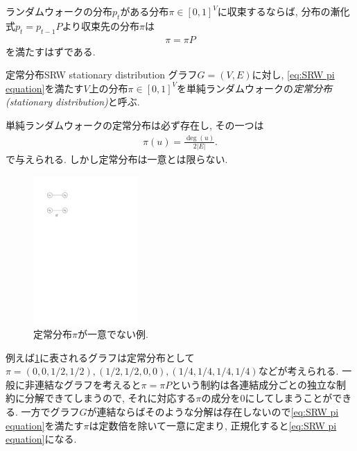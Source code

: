 ランダムウォークの分布$p_t$がある分布$\pi\in[0,1]^V$に収束するならば, 分布の漸化式$p_t = p_{t-1}P$より収束先の分布$\pi$は
\begin{align}
  \pi = \pi P \label{eq:SRW pi equation}
\end{align}
を満たすはずである.
%
\begin{definition}{定常分布}{SRW stationary distribution}
  グラフ$G=(V,E)$に対し, \cref{eq:SRW pi equation}を満たす$V$上の分布$\pi\in[0,1]^V$を単純ランダムウォークの\emph{定常分布 (stationary distribution)}と呼ぶ.
\end{definition}
%
単純ランダムウォークの定常分布は必ず存在し, その一つは
\begin{align}
  \pi(u) = \frac{\deg(u)}{2|E|}. \label{eq:SRW stationary distribution}
\end{align}
で与えられる.
しかし定常分布は一意とは限らない.
\begin{figure}
  \begin{center}
  \includegraphics[width=4cm]{images/graph1.pdf}
  \caption{定常分布$\pi$が一意でない例.  \label{fig:graph1}}
  \end{center}
\end{figure}
例えば\cref{fig:graph1}に表されるグラフは定常分布として$\pi=(0,0,1/2,1/2),(1/2,1/2,0,0),(1/4,1/4,1/4,1/4)$などが考えられる.
一般に非連結なグラフを考えると$\pi = \pi P$という制約は各連結成分ごとの独立な制約に分解できてしまうので, それに対応する$\pi$の成分を$0$にしてしまうことができる.
一方でグラフ$G$が連結ならばそのような分解は存在しないので\cref{eq:SRW pi equation}を満たす$\pi$は定数倍を除いて一意に定まり, 正規化すると\cref{eq:SRW pi equation}になる.

